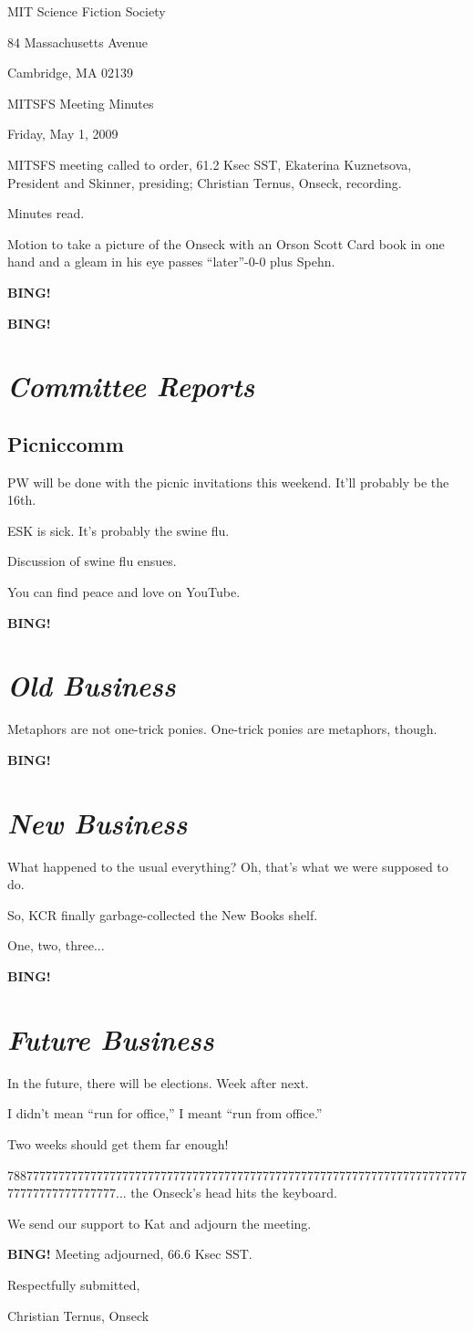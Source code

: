\documentclass[10pt]{article}
\newcommand{\bing}{{\bf BING!} }
\newcommand{\goto}[1]{\bing \vskip 12pt \section*{{\em{#1}}}}
\newcommand{\ps}{ plus Spehn\xspace}
\begin{document}
\begin{center}

MIT Science Fiction Society

84 Massachusetts Avenue

Cambridge, MA 02139

\vspace{12pt}

MITSFS Meeting Minutes

Friday, May 1, 2009

\end{center}

\vspace{18pt}

\setlength{\parskip}{6pt}

\noindent
MITSFS meeting called to order, 61.2 Ksec SST,
Ekaterina Kuznetsova, President and Skinner, presiding; Christian Ternus, Onseck, recording.

Minutes read.

Motion to take a picture of the Onseck with an Orson Scott Card book in one hand and a gleam in his eye passes ``later''-0-0 \ps.

\bing

\goto{Committee Reports}

\subsection*{Picniccomm}

PW will be done with the picnic invitations this weekend.  It'll
probably be the 16th.

ESK is sick.  It's probably the swine flu.

Discussion of swine flu ensues.

You can find peace and love on YouTube.

\goto{Old Business}

Metaphors are not one-trick ponies.  One-trick ponies are metaphors, though.

\goto{New Business}

What happened to the usual everything?  Oh, that's what we were supposed to do.

So, KCR finally garbage-collected the New Books shelf.

One, two, three...

\goto{Future Business}

In the future, there will be elections.  Week after next.

I didn't mean ``run for office,'' I meant ``run from office.''

Two weeks should get them far enough!

78877777777777777777777777777777777777777777777777777777777777777777777777777777777777777...  the Onseck's head hits the keyboard.

We send our support to Kat and adjourn the meeting.

\bing
\noindent
Meeting adjourned, 66.6 Ksec SST.

\vspace{18pt}

\centerline{Respectfully submitted,}
\centerline{Christian Ternus, Onseck}
\end{document}
